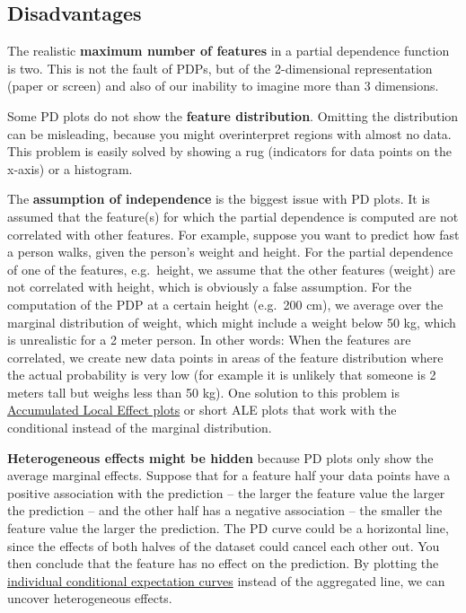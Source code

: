 \documentclass[
  12pt,
]{krantz}
\begin{document}
\hypertarget{disadvantages-5}{%
\subsection{Disadvantages}\label{disadvantages-5}}

The realistic \textbf{maximum number of features} in a partial dependence function is two.
This is not the fault of PDPs, but of the 2-dimensional representation (paper or screen) and also of our inability to imagine more than 3 dimensions.

Some PD plots do not show the \textbf{feature distribution}.
Omitting the distribution can be misleading, because you might overinterpret regions with almost no data.
This problem is easily solved by showing a rug (indicators for data points on the x-axis) or a histogram.

The \textbf{assumption of independence} is the biggest issue with PD plots.
It is assumed that the feature(s) for which the partial dependence is computed are not correlated with other features.
For example, suppose you want to predict how fast a person walks, given the person's weight and height.
For the partial dependence of one of the features, e.g.~height, we assume that the other features (weight) are not correlated with height, which is obviously a false assumption.
For the computation of the PDP at a certain height (e.g.~200 cm), we average over the marginal distribution of weight, which might include a weight below 50 kg, which is unrealistic for a 2 meter person.
In other words:
When the features are correlated, we create new data points in areas of the feature distribution where the actual probability is very low (for example it is unlikely that someone is 2 meters tall but weighs less than 50 kg).
One solution to this problem is \protect\hyperlink{ale}{Accumulated Local Effect plots} or short ALE plots that work with the conditional instead of the marginal distribution.

\textbf{Heterogeneous effects might be hidden} because PD plots only show the average marginal effects.
Suppose that for a feature half your data points have a positive association with the prediction -- the larger the feature value the larger the prediction -- and the other half has a negative association -- the smaller the feature value the larger the prediction.
The PD curve could be a horizontal line, since the effects of both halves of the dataset could cancel each other out.
You then conclude that the feature has no effect on the prediction.
By plotting the \protect\hyperlink{ice}{individual conditional expectation curves} instead of the aggregated line, we can uncover heterogeneous effects.
\end{document}
